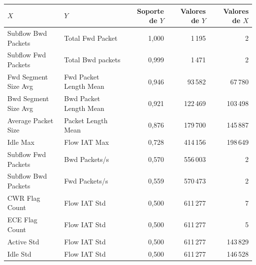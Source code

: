 \begin{tabular}{@{}llrrr@{}}
\toprule
$X$ & $Y$ & Soporte de $Y$ & Valores de $Y$ & Valores de $X$ \\
\midrule
Subflow Bwd Packets & Total Fwd Packet & 1{,}000 & 1\,195 & 2 \\
Subflow Fwd Packets & Total Bwd packets & 0{,}999 & 1\,471 & 2 \\
Fwd Segment Size Avg & Fwd Packet Length Mean & 0{,}946 & 93\,582 & 67\,780 \\
Bwd Segment Size Avg & Bwd Packet Length Mean & 0{,}921 & 122\,469 & 103\,498 \\
Average Packet Size & Packet Length Mean & 0{,}876 & 179\,700 & 145\,887 \\
Idle Max & Flow IAT Max & 0{,}728 & 414\,156 & 198\,649 \\
Subflow Fwd Packets & Bwd Packets/s & 0{,}570 & 556\,003 & 2 \\
Subflow Bwd Packets & Fwd Packets/s & 0{,}559 & 570\,473 & 2 \\
CWR Flag Count & Flow IAT Std & 0{,}500 & 611\,277 & 7 \\
ECE Flag Count & Flow IAT Std & 0{,}500 & 611\,277 & 5 \\
Active Std & Flow IAT Std & 0{,}500 & 611\,277 & 143\,829 \\
Idle Std & Flow IAT Std & 0{,}500 & 611\,277 & 146\,528 \\
\bottomrule
\end{tabular}
